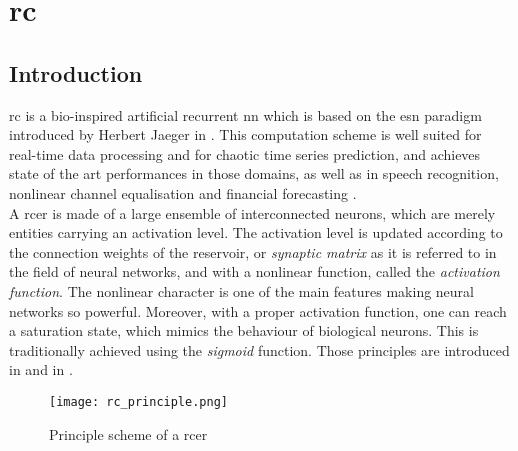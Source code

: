 \chapter{\acrlong{rc}}
\label{rc}

\section{Introduction}


\gls{rc} is a bio-inspired artificial recurrent \gls{nn} which is based on the \gls{esn} paradigm introduced by Herbert Jaeger in \cite{Jaeger2004}. This computation scheme is well suited for real-time data processing and for chaotic time series prediction\cite{Jaeger2004, JaegerH.2001Tesa, Lukoeviius2012}, and achieves state of the art performances in those domains, as well as in speech recognition\cite{Verstraeten2006, NIPS2010_4056, Jaeger2007}, nonlinear channel equalisation\cite{Jaeger2004} and financial forecasting \cite{financialTimeSeries}.\\

A \gls{rcer} is made of a large ensemble of interconnected neurons, which are merely entities carrying an activation level. The activation level  is updated according to the connection weights of the reservoir, or \emph{synaptic matrix} as it is referred to in the field of neural networks, and with a nonlinear function, called the \textit{activation function}. The nonlinear character is one of the main features making neural networks so powerful. Moreover, with a proper activation function, one can reach a saturation state, which mimics the behaviour of biological neurons. This is traditionally achieved using the \textit{sigmoid} function. Those principles are introduced in \cite[p.227-228]{bishop2006pattern} and in \cite[p.727-728]{russell2010artificial}.\\

\begin{figure}[h]
	\centering
	\texttt{[image: rc\_principle.png]}
	\caption{Principle scheme of a \acrshort{rcer} \cite{financialTimeSeries}}
	\label{rc_principle}
\end{figure}


